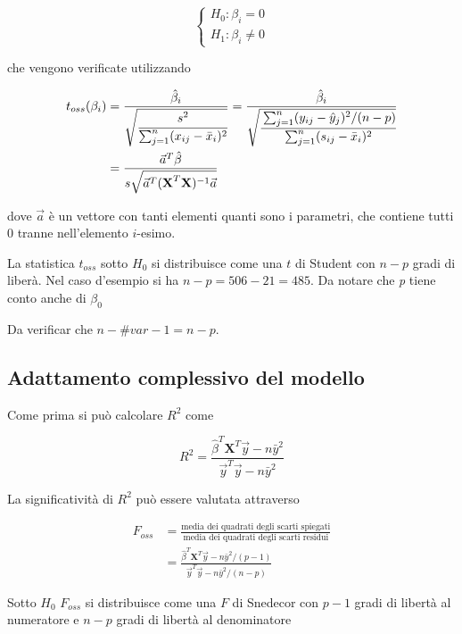 $$
\begin{cases}
H_0 : \beta_i = 0\\
H_1 : \beta_i \neq 0
\end{cases}
$$

che vengono verificate utilizzando

\begin{align*}
t_{oss}(\beta_i) &= \frac{\hat{\beta}_i}{\sqrt{\cfrac{s^2}{\sum_{j=1}^{n} (x_{ij} - \bar{x}_i)^2}}} = \frac{\hat{\beta}_i}{ \sqrt{\cfrac{ \sum_{j=1}^{n}(y_{ij} - \hat{y}_j)^2 /(n-p) }{ \sum_{j=1}^{n} (s_{ij} - \bar{x}_i)^2 } } } \\
&= \frac{\vec{a}^T \hat{\beta}}{ s \sqrt{\vec{a}^T (\textbf{X}^T\textbf{X} )^{-1} \vec{a}} }
\end{align*}

dove $ \vec{a} $ è un vettore con tanti elementi quanti sono i parametri, che contiene tutti 0 tranne nell'elemento $ i $-esimo.

La statistica $ t_{oss} $ sotto $ H_0 $ si distribuisce come una $ t $ di Student con $ n-p $ gradi di liberà.
Nel caso d'esempio si ha $ n - p = 506-21 = 485 $. Da notare che \textit{p} tiene conto anche di $ \beta_0 $

Da verificar che $ n - \#var -1 = n-p $.\\


\subsection{Adattamento complessivo del modello}

Come prima si può calcolare $ R^2 $ come

$$
R^2 = \frac{ \hat{\beta}^T \textbf{X}^T\vec{y} - n\bar{y}^2}{ \vec{y}^T\vec{y} - n\bar{y}^2 }
$$

La significatività di $R^2$ può essere valutata attraverso

\begin{align*}
F_{oss} &= \frac{\text{media dei quadrati degli scarti spiegati}}{\text{media dei quadrati degli scarti residui}}\\
			 &=  \frac{ \hat{\beta}^T \textbf{X}^T\vec{y} - n\bar{y}^2 /(p-1) }{ \vec{y}^T\vec{y} - n\bar{y}^2 /(n-p)}
\end{align*}


Sotto $ H_0 $ $ F_{oss} $ si distribuisce come una $ F $ di Snedecor con $ p-1 $ gradi di libertà al numeratore e $ n-p $ gradi di libertà al denominatore

